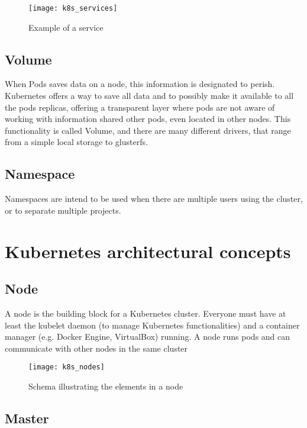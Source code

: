 \begin{figure}[htbp]
\centering
\texttt{[image: k8s\_services]}
\caption{Example of a service}
\end{figure}

\subsection{Volume}\label{volume}

When Pods saves data on a node, this information is designated to perish.
Kubernetes offers a way to save all data and to possibly make it
available to all the pods replicas, offering a transparent layer where
pods are not aware of working with information shared other pods, even located
in other nodes. This functionality is called Volume, and there are many
different drivers, that range from a simple local storage to glusterfs.

\subsection{Namespace}\label{namespace}

Namespaces are intend to be used when there are multiple users using the
cluster, or to separate multiple projects.

\section{Kubernetes architectural concepts}
\label{kubernetes-architectural-concepts}

\subsection{Node}\label{node}

A node is the building block for a Kubernetes cluster. Everyone must have
at least the kubelet daemon (to manage Kubernetes functionalities) and a
container manager (e.g. Docker Engine, VirtualBox) running. A node runs pods
and can communicate with other nodes in the same cluster

\begin{figure}[htbp]
\centering
\texttt{[image: k8s\_nodes]}
\caption{Schema illustrating the elements in a node}
\end{figure}

\subsection{Master}\label{master}

